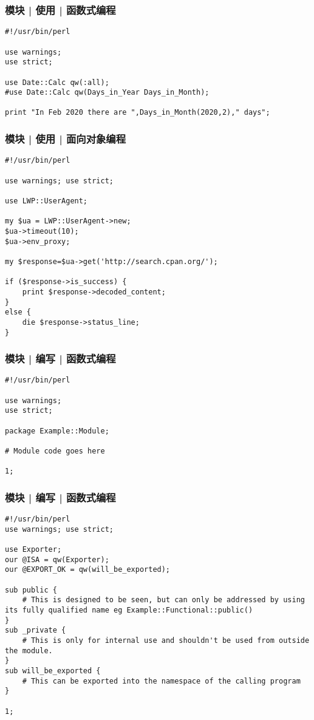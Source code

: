\begin{frame}[fragile]
  \frametitle{模块 | 使用 | 函数式编程}
\begin{lstlisting}
#!/usr/bin/perl

use warnings;
use strict;

use Date::Calc qw(:all);
#use Date::Calc qw(Days_in_Year Days_in_Month);

print "In Feb 2020 there are ",Days_in_Month(2020,2)," days";
\end{lstlisting}
\end{frame}

\begin{frame}[fragile]
  \frametitle{模块 | 使用 | 面向对象编程}
  \vspace{-0.6em}
  \begin{lstlisting}[basicstyle=\small\tt]
#!/usr/bin/perl

use warnings; use strict;

use LWP::UserAgent;
 
my $ua = LWP::UserAgent->new;
$ua->timeout(10);
$ua->env_proxy;
 
my $response=$ua->get('http://search.cpan.org/');
 
if ($response->is_success) {
    print $response->decoded_content;
}
else {
    die $response->status_line;
}
\end{lstlisting}
\end{frame}

\begin{frame}[fragile]
  \frametitle{模块 | 编写 | 函数式编程}
\begin{lstlisting}
#!/usr/bin/perl

use warnings;
use strict;

package Example::Module;

# Module code goes here

1;
\end{lstlisting}
\end{frame}

\begin{frame}[fragile]
  \frametitle{模块 | 编写 | 函数式编程}
\begin{lstlisting}[basicstyle=\scriptsize\tt,numberstyle=\scriptsize]
#!/usr/bin/perl
use warnings; use strict;

use Exporter;
our @ISA = qw(Exporter);
our @EXPORT_OK = qw(will_be_exported);

sub public {
    # This is designed to be seen, but can only be addressed by using its fully qualified name eg Example::Functional::public()
}
sub _private {
    # This is only for internal use and shouldn't be used from outside the module.
}
sub will_be_exported {
    # This can be exported into the namespace of the calling program
}

1;
\end{lstlisting}
\end{frame}

